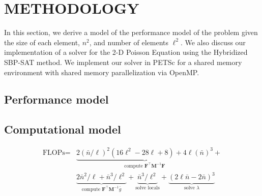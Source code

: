 % 
% 
%
\section{METHODOLOGY}

%
%
%
In this section, we derive a model of the performance model of the problem given the size of each element, $n^2$, and number of elements $\ell^2$.
We also discuss our implementation of a solver for the 2-D Poisson Equation using the Hybridized SBP-SAT method. 
We implement our solver in PETSc for a shared memory environment with shared memory parallelization via OpenMP.

%
%
%
\subsection{Performance model} 


\subsection{Computational model}
\begin{equation}
\begin{split}
	\text{FLOPs} = & \underbrace{2(\bar{n}/\ell)^2 (16\ell^2 - 28\ell + 8) + 4\ell(
	\bar{n})^3}_{\text{compute }\textbf{F}^{\intercal} \textbf{M}^{-1} \textbf{F}} + \\
	& \underbrace{2 \bar{n}^2 / \ell + \bar{n}^3 / \ell^2}_{\text{compute }\textbf{F}^{\intercal} \textbf{M}^{-1} \bar{g}} 
	+ \underbrace{\bar{n}^3 / \ell^2 }_{\text{solve locals}} 
	+ \underbrace{(2\ell \bar{n} - 2\bar{n})^3}_{\text{solve } \lambda} 
\end{split}
\end{equation}



